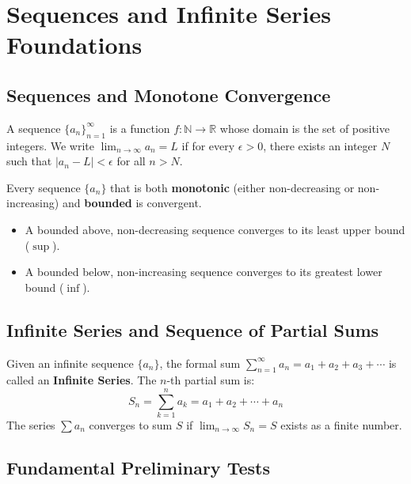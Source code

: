 \section{Sequences and Infinite Series Foundations}

\subsection{Sequences and Monotone Convergence}

\begin{definition}
A sequence $\{a_n\}_{n=1}^\infty$ is a function $f: \mathbb{N} \to \mathbb{R}$ whose domain is the set of positive integers. We write $\lim_{n\to\infty} a_n = L$ if for every $\epsilon > 0$, there exists an integer $N$ such that $|a_n - L| < \epsilon$ for all $n > N$.
\end{definition}

\begin{theorem}
Every sequence $\{a_n\}$ that is both \textbf{monotonic} (either non-decreasing or non-increasing) and \textbf{bounded} is convergent.
\begin{itemize}[leftmargin=1.5em]
    \item A bounded above, non-decreasing sequence converges to its least upper bound ($\sup$).
    \item A bounded below, non-increasing sequence converges to its greatest lower bound ($\inf$).
\end{itemize}
\end{theorem}

\subsection{Infinite Series and Sequence of Partial Sums}

\begin{definition}
Given an infinite sequence $\{a_n\}$, the formal sum $\sum_{n=1}^\infty a_n = a_1 + a_2 + a_3 + \cdots$ is called an \textbf{Infinite Series}. The $n$-th partial sum is:
\begin{equation}
    S_n = \sum_{k=1}^n a_k = a_1 + a_2 + \cdots + a_n
\end{equation}
The series $\sum a_n$ converges to sum $S$ if $\lim_{n\to\infty} S_n = S$ exists as a finite number.
\end{definition}

\subsection{Fundamental Preliminary Tests}

